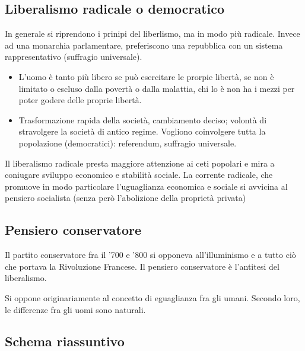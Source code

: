 \documentclass[a4paper]{article}
\begin{document}
\subsection{Liberalismo radicale o democratico}

In generale si riprendono i prinipi del liberlismo, ma in modo più radicale.
Invece ad una monarchia parlamentare, preferiscono una repubblica con un sistema rappresentativo (suffragio universale).

\begin{itemize}
    \item L'uomo è tanto più libero se può esercitare le prorpie libertà, se non è limitato o escluso dalla povertà o dalla malattia, chi lo è non ha i mezzi per poter godere delle proprie libertà.
    \item Trasformazione rapida della società, cambiamento deciso; volontà di stravolgere la società di antico regime. Vogliono coinvolgere tutta la popolazione (democratici): referendum, suffragio universale.
\end{itemize}

Il liberalismo radicale presta maggiore attenzione ai ceti popolari e mira a coniugare sviluppo
economico e stabilità sociale. La corrente radicale, che promuove in modo particolare
l'uguaglianza economica e sociale si avvicina al pensiero socialista (senza però l'abolizione della
proprietà privata)

\subsection{Pensiero conservatore}


Il partito conservatore fra il '700 e '800 si opponeva all'illuminismo e a tutto ciò che portava la Rivoluzione Francese.
Il pensiero conservatore è l'antitesi del liberalismo.

Si oppone originariamente al concetto di eguaglianza fra gli umani. Secondo loro, le differenze fra gli uomi sono naturali.

\pagebreak

\subsection{Schema riassuntivo}
\end{document}
